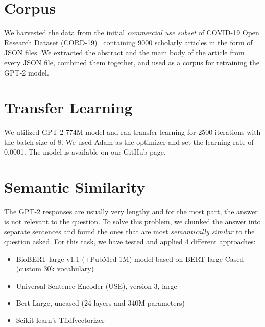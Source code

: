 \documentclass[sigconf,natbib=false]{acmart}
\begin{document}

\section{Corpus}

We harvested the data from the initial \textit{commercial use subset} of
COVID-19 Open Research Dataset (CORD-19)~\cite{cord19} containing 9000
scholarly articles in the form of JSON files. We extracted the abstract and the
main body of the article from every JSON file, combined them together, and used
as a corpus for retraining the GPT-2 model.


\section{Transfer Learning}

We utilized GPT-2 774M model and ran transfer learning for 2500 iterations with
the batch size of 8. We used Adam as the optimizer and set the learning rate of
0.0001. The model is available on our GitHub page.


\section{Semantic Similarity}

The GPT-2 responses are usually very lengthy and for the most part, the answer
is not relevant to the question. To solve this problem, we chunked the answer
into separate sentences and found the ones that are most \textit{semantically
  similar} to the question asked. For this task, we have tested and applied 4
different approaches:

\begin{itemize}
  \item BioBERT large v1.1 (+PubMed 1M) model based on BERT-large Cased (custom 30k vocabulary)
  \item Universal Sentence Encoder (USE), version 3, large
  \item Bert-Large, uncased (24 layers and 340M parameters)
  \item Scikit learn's Tfidfvectorizer
\end{itemize}
\end{document}
